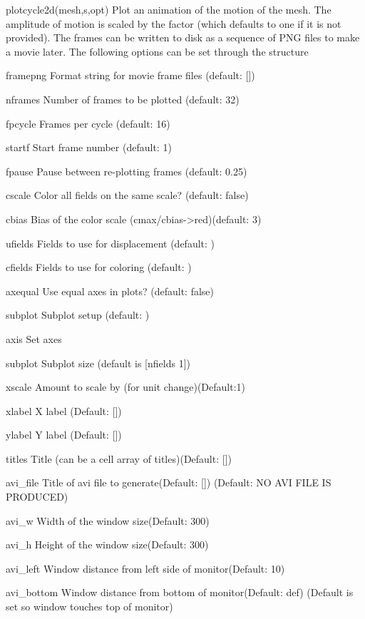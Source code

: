 \begin{codelist}
  \item[plotcycle2d(mesh,s,opt)]
    Plot an animation of the motion of the mesh.  The amplitude of
    motion is scaled by the factor  (which defaults to one
    if it is not provided).  The frames can be written to disk as a
    sequence of PNG files to make a movie later.
    The following options can be set through the  structure
    \begin{codelist}[framepng]
      \item[framepng] Format string for movie frame files (default: [])
      \item[nframes]  Number of frames to be plotted (default: 32)
      \item[fpcycle]  Frames per cycle (default: 16)
      \item[startf]   Start frame number (default: 1)
      \item[fpause]   Pause between re-plotting frames (default: 0.25)
      \item[cscale]   Color all fields on the same scale? (default: false)
      \item[cbias]    Bias of the color scale (cmax/cbias->red)(default: 3)
      \item[ufields]  Fields to use for displacement 
        (default: \ttt{[1 2]})
      \item[cfields]  Fields to use for coloring
        (default: \ttt{[1 2]})
      \item[axequal]  Use equal axes in plots? (default: false)
      \item[subplot]  Subplot setup (default: )

      \item[axis]     Set axes
      \item[subplot]  Subplot size (default is [nfields 1])
      \item[xscale]   Amount to scale by (for unit change)(Default:1)
      \item[xlabel]   X label (Default: [])
      \item[ylabel]   Y label (Default: []) 
      \item[titles]   Title (can be a cell array of titles)(Default: []) 
      \item[avi\_file]Title of avi file to generate(Default: []) 
                         (Default: NO AVI FILE IS PRODUCED)
      \item[avi\_w]    Width  of the window size(Default: 300) 
      \item[avi\_h]    Height of the window size(Default: 300) 
      \item[avi\_left] Window distance from left side of monitor(Default: 10) 
      \item[avi\_bottom]Window distance from bottom    of monitor(Default: def) 
                        (Default is set so window touches top of monitor)

    \end{codelist}
\end{codelist}


